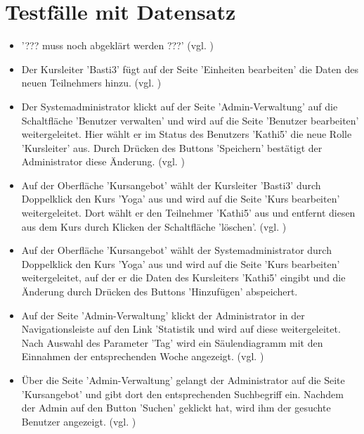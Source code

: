 \documentclass[a4paper]{scrreprt}
\newcounter{Lc}
\newcounter{Hc}
\newcommand{\stepHc}{\stepcounter{Hc}\setcounter{Lc}{0}}
\begin{document}
\section{Testfälle mit Datensatz}
			\stepHc
			\begin{itemize}
				\item {}
				'??? muss noch abgeklärt werden ???' (vgl. )
				
				\item {}
				Der Kursleiter 'Basti3' fügt auf der Seite 'Einheiten bearbeiten' die Daten des neuen Teilnehmers hinzu. (vgl. )
						
				\item {} 
				Der Systemadministrator klickt auf der Seite 'Admin-Verwaltung' auf die Schaltfläche 'Benutzer verwalten' und wird auf die Seite 'Benutzer bearbeiten' weitergeleitet. Hier wählt er im Status des Benutzers 'Kathi5' die neue Rolle 'Kursleiter' aus. Durch Drücken des Buttons 'Speichern' bestätigt der Administrator diese Änderung. (vgl. )
				
				\item {}
				Auf der Oberfläche 'Kursangebot' wählt der Kursleiter 'Basti3' durch Doppelklick den Kurs 'Yoga' aus und wird auf die Seite 'Kurs bearbeiten' weitergeleitet. Dort wählt er den Teilnehmer 'Kathi5' aus und entfernt diesen aus dem Kurs durch Klicken der Schaltfläche 'löschen'. (vgl. )
				
				\item {}
				Auf der Oberfläche 'Kursangebot' wählt der Systemadministrator durch Doppelklick den Kurs 'Yoga' aus und wird auf die Seite 'Kurs bearbeiten' weitergeleitet, auf der er die Daten des Kursleiters 'Kathi5' eingibt und die Änderung durch Drücken des Buttons 'Hinzufügen' abspeichert. 
				
				\item {}
				Auf der Seite 'Admin-Verwaltung' klickt der Administrator in der Navigationsleiste auf den Link 'Statistik und wird auf diese weitergeleitet. Nach Auswahl des Parameter 'Tag' wird ein Säulendiagramm mit den Einnahmen der entsprechenden Woche angezeigt. (vgl. )
				
				\item {}
				Über die Seite 'Admin-Verwaltung' gelangt der Administrator auf die Seite 'Kursangebot' und gibt dort den entsprechenden Suchbegriff ein. Nachdem der Admin auf den Button 'Suchen' geklickt hat, wird ihm der gesuchte Benutzer angezeigt. (vgl. )
				

\end{itemize}
\end{document}

